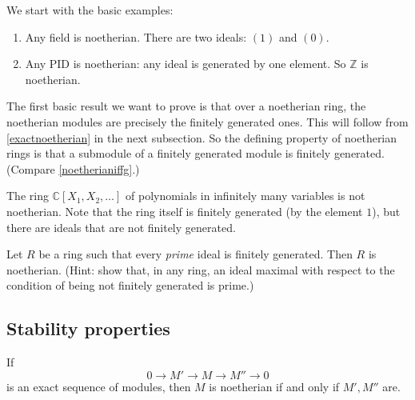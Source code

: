 We start with the basic examples:

\begin{example} 
\begin{enumerate}
\item Any field is noetherian. There are two ideals: $(1)$ and $(0)$. 
\item Any PID is noetherian: any ideal is generated by one element. So
$\mathbb{Z}$ is noetherian.
\end{enumerate}
\end{example} 

The first basic result we want to prove is that over a noetherian ring, the
noetherian modules are precisely the finitely generated ones.  This will
follow from \cref{exactnoetherian} in the next subsection. So the defining 
property of noetherian rings is that a submodule of a finitely generated
module is finitely generated. (Compare
\cref{noetherianiffg}.)

\begin{exercise} 
The ring $\mathbb{C}[X_1, X_2, \dots]$ of polynomials in infinitely many
variables is not noetherian. Note that the ring itself is finitely generated
(by the element $1$), but there are ideals that are not finitely generated.
\end{exercise} 

\begin{exercise} 
Let $R$ be a ring such that every \emph{prime} ideal is finitely generated.
Then $R$ is noetherian. (Hint: show that, in any ring, an ideal maximal with respect to the
condition of being not finitely generated is prime.)
\end{exercise} 

\subsection{Stability properties}
\begin{proposition} \label{exactnoetherian}
If 
\[ 0 \to M' \to  M \to M'' \to 0  \]
is an exact sequence of modules, then $M$ is noetherian if and only if $M',
M''$ are.
\end{proposition} 

